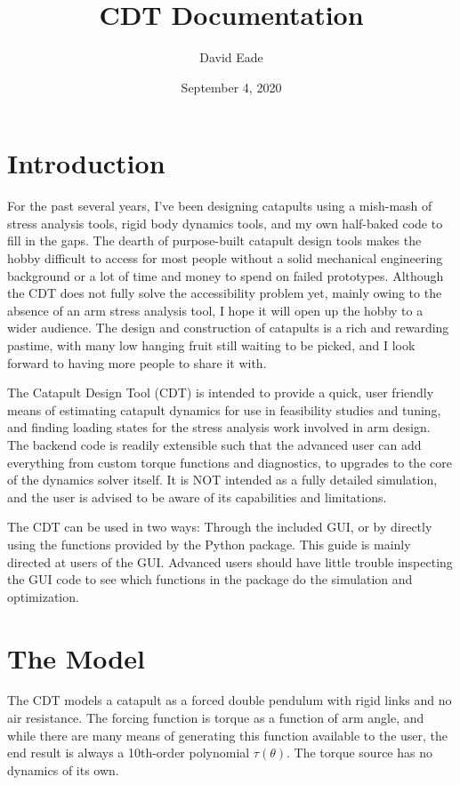 \documentclass{article}
\title{CDT Documentation}
\author{David Eade}
\date{September 4, 2020}
\begin{document}
\maketitle

\tableofcontents

\section{Introduction}
For the past several years, I've been designing catapults using a mish-mash of stress analysis tools, rigid body dynamics tools, and my own half-baked code to fill in the gaps. The dearth of purpose-built catapult design tools makes the hobby difficult to access for most people without a solid mechanical engineering background or a lot of time and money to spend on failed prototypes. Although the CDT does not fully solve the accessibility problem yet, mainly owing to the absence of an arm stress analysis tool, I hope it will open up the hobby to a wider audience. The design and construction of catapults is a rich and rewarding pastime, with many low hanging fruit still waiting to be picked, and I look forward to having more people to share it with.\par
The Catapult Design Tool (CDT) is intended to provide a quick, user friendly means of estimating catapult dynamics for use in feasibility studies and tuning, and finding loading states for the stress analysis work involved in arm design. The backend code is readily extensible such that the advanced user can add everything from custom torque functions and diagnostics, to upgrades to the core of the dynamics solver itself. It is NOT intended as a fully detailed simulation, and the user is advised to be aware of its capabilities and limitations.\par
The CDT can be used in two ways: Through the included GUI, or by directly using the functions provided by the Python package. This guide is mainly directed at users of the GUI. Advanced users should have little trouble inspecting the GUI code to see which functions in the package do the simulation and optimization.

\section{The Model}
The CDT models a catapult as a forced double pendulum with rigid links and no air resistance.  The forcing function is torque as a function of arm angle, and while there are many means of generating this function available to the user, the end result is always a 10th-order polynomial $\tau(\theta)$. The torque source has no dynamics of its own.\\
\end{document}
